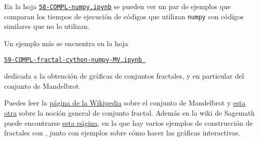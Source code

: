 En la hoja 
\href{http://localhost:8888/notebooks/PROGR/COMPL/58-COMPL-numpy.ipynb}{\tt 58-COMPL-numpy.ipynb}
se pueden ver un par de ejemplos que comparan los tiempos de ejecuci\'on de
c\'odigos que utilizan \lstinline|numpy| con c\'odigos similares que no lo
utilizan.


Un ejemplo m\'as se encuentra en la hoja 
\begin{center}
\href{http://localhost:8888/notebooks/PROGR/COMPL/59-COMPL-fractal-cython-numpy-MV.ipynb}{\tt 59-COMPL-fractal-cython-numpy-MV.ipynb } 
\end{center}
\noindent dedicada a la obtenci\'on de gr\'aficas de conjuntos fractales, y en
particular del conjunto de Mandelbrot.

Puedes leer la 
\href{http://en.wikipedia.org/wiki/Mandelbrot_set}{p\'agina de la Wikipedia}
sobre el conjunto de Mandelbrot y 
\href{http://en.wikipedia.org/wiki/Fractal}{esta otra} sobre la noci\'on general
de conjunto fractal.  Adem\'as en la wiki de Sagemath puede encontrarse 
\href{http://wiki.sagemath.org/interact/fractal}{esta p\'agina}, en la que hay
varios ejemplos de construcci\'on de fractales con {\sage}, junto con ejemplos
sobre c\'omo hacer las gr\'aficas interactivas.